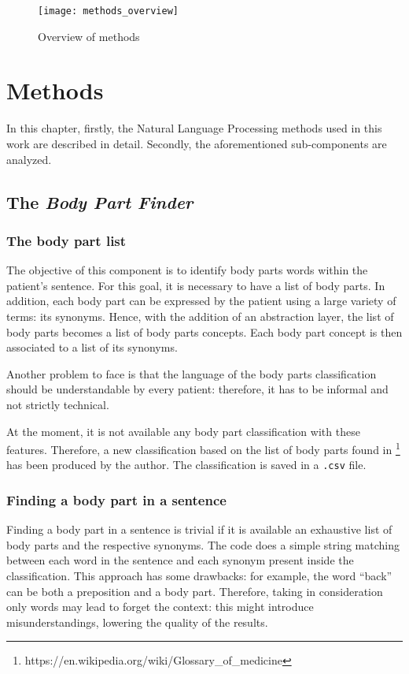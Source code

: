 \begin{figure}[h]
\centering
\texttt{[image: methods\_overview]}
\caption{Overview of methods}
\medskip
\end{figure}

\newpage
\chapter{Methods}
\label{cha:methods}
In this chapter, firstly, the Natural Language Processing methods used in this work are described in detail. Secondly, the aforementioned sub-components are analyzed.

\section{The \textit{Body Part Finder}}
\label{sec:body_part_finder}
\subsection{The body part list}
The objective of this component is to identify body parts words within the patient's sentence. For this goal, it is necessary to have a list of body parts. In addition, each body part can be expressed by the patient using a large variety of terms: its synonyms. Hence, with the addition of an abstraction layer, the list of body parts becomes a list of body parts concepts. Each body part concept is then associated to a list of its synonyms. 

Another problem to face is that the language of the body parts classification should be understandable by every patient: therefore, it has to be informal and not strictly technical.

At the moment, it is not available any body part classification with these features. Therefore, a new classification based on the list of body parts found in \footnote{https://en.wikipedia.org/wiki/Glossary\_of\_medicine} \cite{bodypartswiki} has been produced by the author. The classification is saved in a \texttt{.csv} file.

\subsection{Finding a body part in a sentence}
Finding a body part in a sentence is trivial if it is available an exhaustive list of body parts and the respective synonyms. The code does a simple string matching between each word in the sentence and each synonym present inside the classification. This approach has some drawbacks: for example, the word “back” can be both a preposition and a body part. Therefore, taking in consideration only words may lead to forget the context: this might introduce misunderstandings, lowering the quality of the results.

